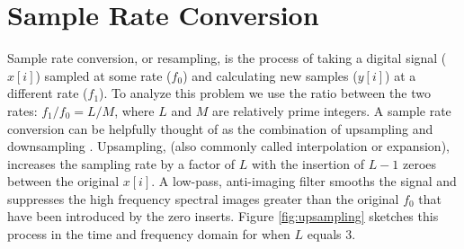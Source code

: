\section{Sample Rate Conversion} \label{sec:src_basics}

Sample rate conversion, or resampling, is the process of taking a digital signal ($x[i]$) sampled at some rate 
($f_0$) and calculating new samples ($y[i]$) at a different rate ($f_1$).  To analyze this problem we use the 
ratio between the two rates: $f_1/f_0 = L/M$, where $L$ and $M$ are relatively prime integers.  A sample rate 
conversion can be helpfully thought of as the combination of upsampling and downsampling 
\citep{oppenheim10,lyons11}.  
Upsampling, (also commonly called interpolation or expansion), increases the sampling rate 
by a factor of $L$ with the insertion of $L-1$ zeroes between the original $x[i]$.  A low-pass, 
anti-imaging filter smooths the signal and suppresses the high frequency spectral images greater than the original 
$f_0$ that have been introduced by the zero inserts.  Figure \ref{fig:upsampling} sketches this process in the 
time and frequency domain for when $L$ equals 3. 

